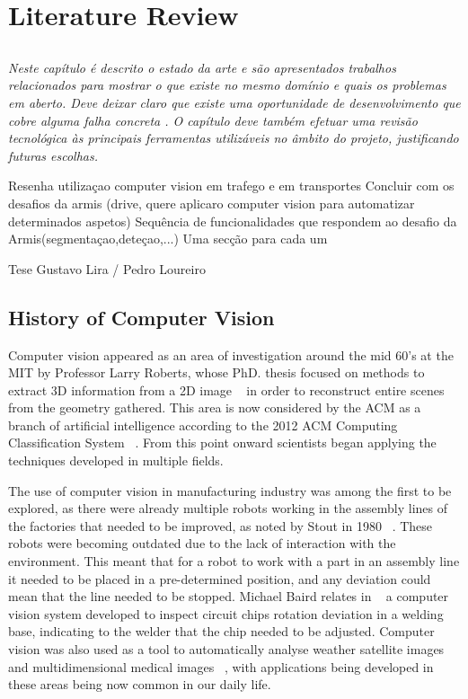 
\chapter{Literature Review} \label{chap:sota}

\section*{}
\textit{
Neste capítulo é descrito o estado da arte e são
apresentados trabalhos relacionados para mostrar o que existe no
mesmo domínio e quais os problemas em aberto.
Deve deixar claro que existe uma oportunidade de desenvolvimento que
cobre alguma falha concreta .
O capítulo deve também efetuar uma revisão tecnológica às principais
ferramentas utilizáveis no âmbito do projeto, justificando futuras
escolhas.
}

Resenha utilizaçao computer vision em trafego e em transportes
Concluir com os desafios da armis (drive, quere aplicaro computer vision para automatizar determinados aspetos)
Sequência de funcionalidades que respondem ao desafio da Armis(segmentaçao,deteçao,...)
Uma secção para cada um

Tese Gustavo Lira / Pedro Loureiro

\section{History of Computer Vision}

Computer vision appeared as an area of investigation around the mid 60's at the MIT by Professor Larry Roberts, whose PhD. thesis focused on methods to extract 3D information from a 2D image ~\cite{huang_computer_1996} in order to reconstruct entire scenes from the geometry gathered. This area is now considered by the ACM as a branch of artificial intelligence according to the 2012 ACM Computing Classification System ~\cite{acm_2012_2012}. From this point onward scientists began applying the techniques developed in multiple fields.

The use of computer vision in manufacturing industry was among the first to be explored, as there were already multiple robots working in the assembly lines of the factories that needed to be improved, as noted by Stout in 1980 ~\cite{stout_computer_1980}. These robots were becoming outdated due to the lack of interaction with the environment. This meant that for a robot to work with a part in an assembly line it needed to be placed in a pre-determined position, and any deviation could mean that the line needed to be stopped. Michael Baird relates in ~\cite{l._baird_sight-i:_1978} a computer vision system developed to inspect circuit chips rotation deviation in a welding base, indicating to the welder that the chip needed to be adjusted. Computer vision was also used as a tool to automatically analyse weather satellite images ~\cite{binford_computer_1973-2} and multidimensional medical images ~\cite{ayache_medical_1998}, with applications being developed in these areas being now common in our daily life.

